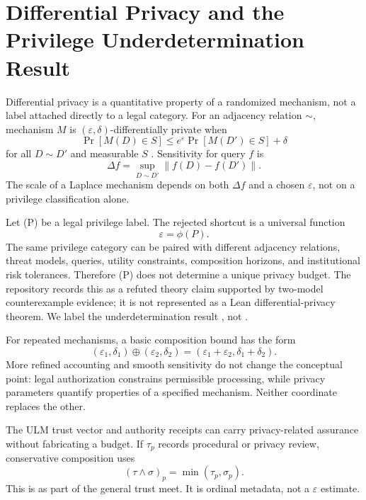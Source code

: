 \section{Differential Privacy and the Privilege Underdetermination Result}
\label{sec:dp}

Differential privacy is a quantitative property of a randomized mechanism, not a label attached directly to a legal category. For an adjacency relation $\sim$, mechanism $M$ is $(\varepsilon,\delta)$-differentially private when
\begin{equation}
\Pr[M(D)\in S]\le e^{\varepsilon}\Pr[M(D')\in S]+\delta
\label{eq:dp}
\end{equation}
for all $D\sim D'$ and measurable $S$ \citep{DworkEtAl2006,DworkRoth2014}. Sensitivity for query $f$ is
\begin{equation}
\Delta f=\sup_{D\sim D'}\|f(D)-f(D')\|.
\label{eq:sensitivity}
\end{equation}
The scale of a Laplace mechanism depends on both $\Delta f$ and a chosen $\varepsilon$, not on a privilege classification alone.

Let (P) be a legal privilege label. The rejected shortcut is a universal function
\begin{equation}
\varepsilon=\phi(P).
\label{eq:privilege-epsilon}
\end{equation}
The same privilege category can be paired with different adjacency relations, threat models, queries, utility constraints, composition horizons, and institutional risk tolerances. Therefore (P) does not determine a unique privacy budget. The repository records this as a refuted theory claim supported by two-model counterexample evidence; it is not represented as a Lean differential-privacy theorem. We label the underdetermination result \derived{}, not \formalized{}.

For repeated mechanisms, a basic composition bound has the form
\begin{equation}
(\varepsilon_1,\delta_1)\oplus(\varepsilon_2,\delta_2)
=(\varepsilon_1+\varepsilon_2,\delta_1+\delta_2).
\label{eq:basic-composition}
\end{equation}
More refined accounting and smooth sensitivity \citep{NissimEtAl2007} do not change the conceptual point: legal authorization constrains permissible processing, while privacy parameters quantify properties of a specified mechanism. Neither coordinate replaces the other.

The ULM trust vector and authority receipts can carry privacy-related assurance without fabricating a budget. If $\tau_p$ records procedural or privacy review, conservative composition uses
\begin{equation}
(\tau\wedge\sigma)_p=\min(\tau_p,\sigma_p).
\label{eq:privacy-trust-meet}
\end{equation}
This is \formalized{} as part of the general trust meet. It is ordinal metadata, not a $\varepsilon$ estimate.

